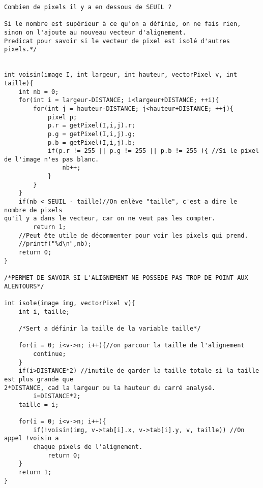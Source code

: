 \documentclass[a4paper , 10pt]{article}
\begin{document}
\begin{verbatim}
Combien de pixels il y a en dessous de SEUIL ?

Si le nombre est supérieur à ce qu'on a définie, on ne fais rien,
sinon on l'ajoute au nouveau vecteur d'alignement. 
Predicat pour savoir si le vecteur de pixel est isolé d'autres pixels.*/


int voisin(image I, int largeur, int hauteur, vectorPixel v, int taille){
	int nb = 0;
	for(int i = largeur-DISTANCE; i<largeur+DISTANCE; ++i){
		for(int j = hauteur-DISTANCE; j<hauteur+DISTANCE; ++j){
			pixel p;
       		p.r = getPixel(I,i,j).r;
        	p.g = getPixel(I,i,j).g;
        	p.b = getPixel(I,i,j).b;
			if(p.r != 255 || p.g != 255 || p.b != 255 ){ //Si le pixel de l'image n'es pas blanc.
				nb++;
			}
		}
	}
	if(nb < SEUIL - taille)//On enlève "taille", c'est a dire le nombre de pixels 
qu'il y a dans le vecteur, car on ne veut pas les compter.
		return 1;
	//Peut ête utile de décommenter pour voir les pixels qui prend.
	//printf("%d\n",nb);
	return 0;
}

/*PERMET DE SAVOIR SI L'ALIGNEMENT NE POSSEDE PAS TROP DE POINT AUX ALENTOURS*/

int isole(image img, vectorPixel v){
	int i, taille;
	
	/*Sert a définir la taille de la variable taille*/
	
	for(i = 0; i<v->n; i++){//on parcour la taille de l'alignement
		continue;
	}
	if(i>DISTANCE*2) //inutile de garder la taille totale si la taille est plus grande que
2*DISTANCE, cad la largeur ou la hauteur du carré analysé. 
		i=DISTANCE*2;
	taille = i;

	for(i = 0; i<v->n; i++){
		if(!voisin(img, v->tab[i].x, v->tab[i].y, v, taille)) //On appel !voisin a 
		chaque pixels de l'alignement.
			return 0;
	}
	return 1;
}
\end{verbatim}
\newpage
\end{document}
